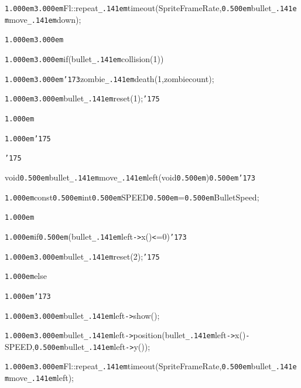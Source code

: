 \documentclass[12pt]{article}
\begin{document}
\noindent
{}{\tt\mc \kern1.000em}{\tt\mc \kern3.000em}Fl::repeat{\tt\_\kern.141em}timeout(SpriteFrameRate,{\tt\mc \kern0.500em}bullet{\tt\_\kern.141em}move{\tt\_\kern.141em}down);

\noindent
{}{\tt\mc \kern1.000em}{\tt\mc \kern3.000em}

\noindent
{}{\tt\mc \kern1.000em}{\tt\mc \kern3.000em}if(bullet{\tt\_\kern.141em}collision(1))

\noindent
{}{\tt\mc \kern1.000em}{\tt\mc \kern3.000em}{\tt\char'173}zombie{\tt\_\kern.141em}death(1,zombiecount);

\noindent
{}{\tt\mc \kern1.000em}{\tt\mc \kern3.000em}bullet{\tt\_\kern.141em}reset(1);{\tt\char'175}

\noindent
{}{\tt\mc \kern1.000em}

\noindent
{}{\tt\mc \kern1.000em}{\tt\char'175}

\noindent
{}{\tt\char'175}

\noindent
{}\hfill

\noindent
{}void{\tt\mc \kern0.500em}bullet{\tt\_\kern.141em}move{\tt\_\kern.141em}left(void{\tt\mc \kern0.500em}{\tt *}){\tt\mc \kern0.500em}{\tt\char'173}

\noindent
{}{\tt\mc \kern1.000em}const{\tt\mc \kern0.500em}int{\tt\mc \kern0.500em}SPEED{\tt\mc \kern0.500em}={\tt\mc \kern0.500em}BulletSpeed;

\noindent
{}{\tt\mc \kern1.000em}

\noindent
{}{\tt\mc \kern1.000em}if{\tt\mc \kern0.500em}(bullet{\tt\_\kern.141em}left{\tt -}{\tt >}x(){\tt <}=0){\tt\char'173}

\noindent
{}{\tt\mc \kern1.000em}{\tt\mc \kern3.000em}bullet{\tt\_\kern.141em}reset(2);{\tt\char'175}

\noindent
{}{\tt\mc \kern1.000em}else

\noindent
{}{\tt\mc \kern1.000em}{\tt\char'173}

\noindent
{}{\tt\mc \kern1.000em}{\tt\mc \kern3.000em}bullet{\tt\_\kern.141em}left{\tt -}{\tt >}show();

\noindent
{}{\tt\mc \kern1.000em}{\tt\mc \kern3.000em}bullet{\tt\_\kern.141em}left{\tt -}{\tt >}position(bullet{\tt\_\kern.141em}left{\tt -}{\tt >}x(){\tt -}SPEED,{\tt\mc \kern0.500em}bullet{\tt\_\kern.141em}left{\tt -}{\tt >}y());

\noindent
{}{\tt\mc \kern1.000em}{\tt\mc \kern3.000em}Fl::repeat{\tt\_\kern.141em}timeout(SpriteFrameRate,{\tt\mc \kern0.500em}bullet{\tt\_\kern.141em}move{\tt\_\kern.141em}left);
\end{document}
